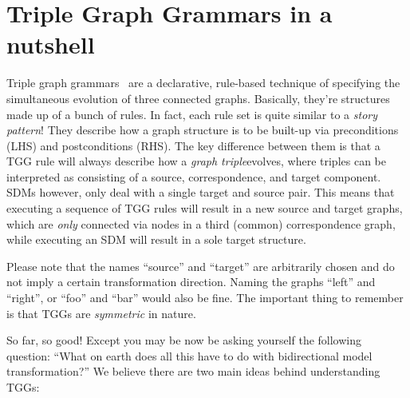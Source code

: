 \section{Triple Graph Grammars in a nutshell}
\label{sec:nutshell}
\genHeader

Triple graph grammars~\cite{tgg:schuerr_94,sk2008,Klar2010} are a declarative, rule-based technique of specifying the simultaneous evolution of three connected
graphs.  Basically, they're structures made up of a bunch of rules. In fact, each rule set is quite similar to a \emph{story pattern}! They describe how a
graph structure is to be built-up via preconditions (LHS) and postconditions (RHS). The key difference between them is that a TGG rule will always
describe how a \emph{graph triple}evolves, where triples can be interpreted as consisting of a source, correspondence, and target
component. SDMs however, only deal with a single target and source pair. This means that executing a sequence of TGG rules will result in a new source and
target graphs, which are \emph{only} connected via nodes in a third (common) correspondence graph, while executing an SDM will result in a sole target
structure.

\vspace{0.25cm}

Please note that the names ``source'' and ``target'' are arbitrarily chosen and do not imply a certain transformation direction. Naming the graphs ``left'' and
``right'', or ``foo'' and ``bar'' would also be fine. The important thing to remember is that TGGs are \emph{symmetric} in nature.

\vspace{0.25cm}

So far, so good! Except you may be now be asking yourself the following question: ``What on earth does all this have to do with bidirectional model
transformation?'' We believe there are two main ideas behind understanding TGGs:

